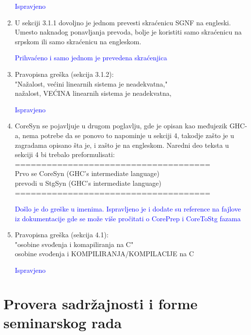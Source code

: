 \documentclass[a4paper]{report}
\newcommand{\odgovor}[1]{\textcolor{blue}{#1}}
\begin{document}
\begin{enumerate}
		\odgovor{Ispravjeno}
		
		\item U sekciji 3.1.1 dovoljno je jednom prevesti skraćenicu SGNF na engleski. Umesto naknadog ponavljanja prevoda, bolje je koristiti samo skraćenicu na srpskom ili samo skraćenicu na engleskom.
		
		\odgovor{Prihvaćeno i samo jednom je prevedena skraćenjica}
		
		\item Pravopisna greška (sekcija 3.1.2):\\	
		"Nažalost, većini linearnih sistema je neadekvatna,"\\
		nažalost, VEĆINA linearnih sistema je neadekvatna,
		
		\odgovor{Ispravjeno}
		
		\item CoreSyn se pojavljuje u drugom poglavlju, gde je opisan kao međujezik GHC-a, nema potrebe da se ponovo to napominje u sekciji 4, takodje zašto je u zagradama opisano šta je, i zašto je na engleskom. Naredni deo teksta u sekciji 4 bi trebalo preformulisati:\\
		=====================================\\
		Prvo se CoreSyn (GHC's intermediate language)\\
		prevodi u StgSyn (GHC's intermediate language)\\
		=====================================
		
		\odgovor{Došlo je do greške u imenima. Ispravljeno je i dodate su reference na fajlove iz dokumentacije gde se može više pročitati o CorePrep i CoreToStg fazama}
		
		\item Pravopisna greška (sekcija 4.1):\\
		"osobine svođenja i komapiliranja na C"\\
		osobine svođenja i KOMPILIRANJA/KOMPILACIJE na C
		
		\odgovor{Ispravjeno}
		
	\end{enumerate}
	
	
	
	
	
	\section{Provera sadržajnosti i forme seminarskog rada}
	
\end{document}
